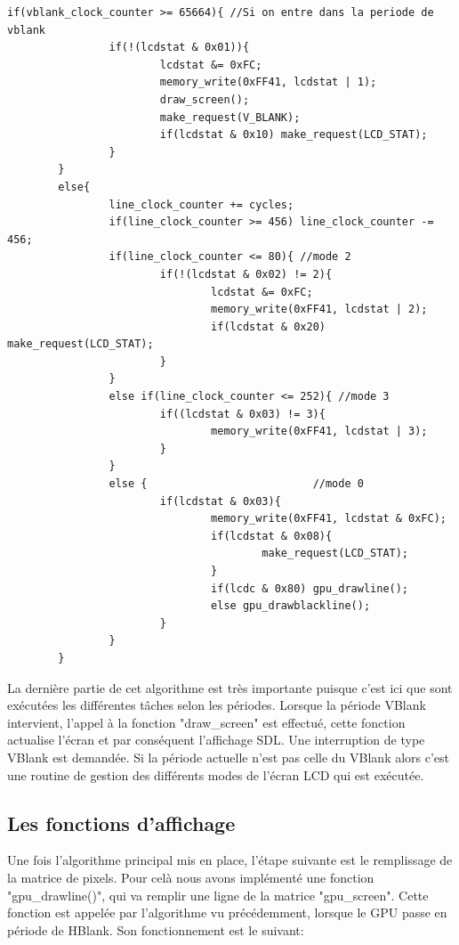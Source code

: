\documentclass[french]{report}
\begin{document}
\begin{lstlisting}
if(vblank_clock_counter >= 65664){ //Si on entre dans la periode de vblank
                if(!(lcdstat & 0x01)){
                        lcdstat &= 0xFC;
                        memory_write(0xFF41, lcdstat | 1);
                        draw_screen();
                        make_request(V_BLANK);
                        if(lcdstat & 0x10) make_request(LCD_STAT);
                }
        }
        else{
                line_clock_counter += cycles;
                if(line_clock_counter >= 456) line_clock_counter -= 456;
                if(line_clock_counter <= 80){ //mode 2
                        if(!(lcdstat & 0x02) != 2){
                                lcdstat &= 0xFC;
                                memory_write(0xFF41, lcdstat | 2);
                                if(lcdstat & 0x20) make_request(LCD_STAT);
                        }
                }
                else if(line_clock_counter <= 252){ //mode 3
                        if((lcdstat & 0x03) != 3){
                                memory_write(0xFF41, lcdstat | 3);
                        }
                }
                else {                          //mode 0 
                        if(lcdstat & 0x03){
                                memory_write(0xFF41, lcdstat & 0xFC);
                                if(lcdstat & 0x08){
                                        make_request(LCD_STAT);
                                }
                                if(lcdc & 0x80) gpu_drawline();
                                else gpu_drawblackline();
                        }
                }
        }

\end{lstlisting}
La dernière partie de cet algorithme est très importante puisque c'est ici que sont exécutées les différentes tâches selon les périodes. Lorsque la période VBlank intervient, l'appel à la fonction "draw\_screen" est effectué, cette fonction actualise l'écran et par conséquent l'affichage SDL. Une interruption de type VBlank est demandée. Si la période actuelle n'est pas celle du VBlank alors c'est une routine de gestion des différents modes de l'écran LCD qui est exécutée.\\

\subsection{Les fonctions d'affichage}
Une fois l'algorithme principal mis en place, l'étape suivante est le remplissage de la matrice de pixels. Pour celà nous avons implémenté une fonction "gpu\_drawline()", qui va remplir une ligne de la matrice "gpu\_screen". Cette fonction est appelée par l'algorithme vu précédemment, lorsque le GPU passe en période de HBlank. Son fonctionnement est le suivant:\\
\end{document}
